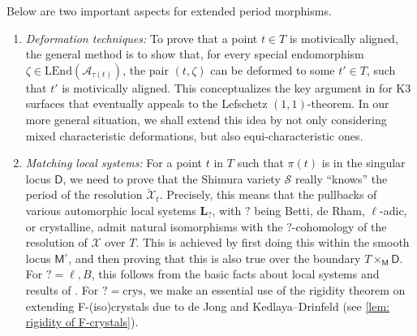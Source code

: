 \documentclass[11pt, letterpaper]{amsart}
\theoremstyle{plain}
\theoremstyle{definition}
\newcommand{\<}{\langle}
\renewcommand{\>}{\rangle}
\newcommand{\shS}{\mathscr{S}}
\newcommand{\sfD}{\mathsf{D}}
\newcommand{\sfM}{\mathsf{M}}
\newcommand{\sA}{\mathcal{A}}
\newcommand{\sX}{\mathcal{X}}
\newcommand{\bL}{\mathbf{L}}
\newcommand{\LEnd}{\mathrm{LEnd}}
\newcommand{\crys}{\mathrm{crys}}
\begin{document}
Below are two important aspects for extended period morphisms. 
\begin{enumerate}[label=\upshape{(\Roman*)}]
	\item \textit{Deformation techniques:} To prove that a point $t \in T$ is motivically aligned, the general method is to show that, for every special endomorphism $\zeta \in \LEnd(\sA_{\tau(t)})$, the pair $(t, \zeta)$ can be deformed to some $t' \in T$, such that $t'$ is motivically aligned. 
        This conceptualizes the key argument in \cite{MPTate} for K3 surfaces that eventually appeals to the Lefschetz $(1, 1)$-theorem. 
	In our more general situation, we shall extend this idea by not only considering mixed characteristic deformations, but also equi-characteristic ones. 
	\item \textit{Matching local systems:} For a point $t$ in  $T$ such that $\pi(t)$ is in the singular locus $\sfD$, we need to prove that the Shimura variety $\shS$ really ``knows'' the period of the resolution $\breve{\sX}_t$. 
	Precisely, this means that the pullbacks of various automorphic local systems $\bL_?$, with $?$ being Betti, de Rham, $\ell$-adic, or crystalline, admit natural isomorphisms with the $?$-cohomology of the resolution of $\sX$ over $T$.
	This is achieved by first doing this within the smooth locus $\sfM^\circ$, and then proving that this is also true over the boundary $T \times_\sfM \sfD$. 
	For $? = \ell, B$, this follows from the basic facts about local systems and results of \cite{HYZ}. 
	For $? = \crys$, we make an essential use of the rigidity theorem on extending F-(iso)crystals due to de Jong and Kedlaya--Drinfeld (see \cref{lem: rigidity of F-crystals}). 
\end{enumerate}
\end{document}
